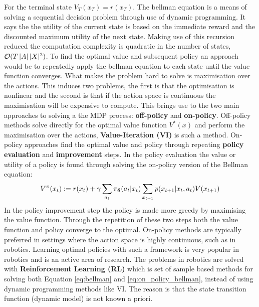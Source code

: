 For the terminal state $V_T(x_T) = r(x_T)$. The bellman equation is a means of solving a sequential decision problem 
through use of dynamic programming. It says the the utility of the current state is based on the immediate reward and 
the discounted maximum utility of the next state. Making use of this recursion reduced the computation complexity is 
quadratic in the number of states, $\operatorname{\mathcal{O}}(T\, |A|\, |X|^2)$. To find the optimal value and subsequent policy an approach 
would be to repeatedly apply the bellman equation to each state until the value function converges. What makes the problem 
hard to solve is maximisation over the actions. This induces two problems, the first is that the optimisation is nonlinear 
and the second is that if the action space is continuous the maximisation will be expensive to compute.
This brings use to the two main approaches to solving a the MDP process: \textbf{off-policy} and \textbf{on-policy}.
Off-policy methods solve directly for the optimal value function $V^*(x)$ and perform the maximisation over the actions, \textbf{Value-Iteration (VI)}
is such a method. On-policy approaches find the optimal value and policy through repeating \textbf{policy evaluation} and
\textbf{improvement} steps. In the policy evaluation the value or utility of a policy is found through solving the on-policy version of the Bellman 
equation:
\begin{equation}\label{eq:on_policy_bellman}
  V^{\pi}(x_t) := r(x_t) + \gamma \sum\limits_{a_t} \operatorname{\pi_{\boldsymbol{\theta}}}(a_t|x_t) \sum\limits_{x_{t+1}} p(x_{t+1}|x_t,a_t) V(x_{t+1})
\end{equation}
In the policy improvement step the policy is made more greedy by maximising the value function. Through the repetition of these two 
steps both the value function and policy converge to the optimal. On-policy methods are typically preferred in settings where the action 
space is highly continuous, such as in robotics. Learning optimal policies with such a framework is very popular in robotics and is 
an active area of research. The problems in robotics are solved with \textbf{Reinforcement Learning (RL)} which is set of sample based 
methods for solving both Equation \ref{eq:bellman} and \ref{eq:on_policy_bellman}, instead of using dynamic programming methods like VI.
The reason is that the state transition function (dynamic model) is not known a priori.
